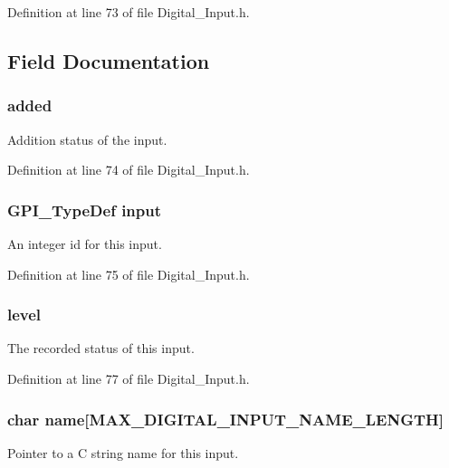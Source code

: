 Definition at line 73 of file Digital\-\_\-\-Input.\-h.



\subsection{Field Documentation}
\hypertarget{struct_digital___input__t_a6f1a4402ff8651dfc5e453b5e3154c2d}{
\subsubsection[{added}]{ added}}\label{struct_digital___input__t_a6f1a4402ff8651dfc5e453b5e3154c2d}
Addition status of the input. 

Definition at line 74 of file Digital\-\_\-\-Input.\-h.

\hypertarget{struct_digital___input__t_abc35a555f8e6b8717b5232ee5220726f}{
\subsubsection[{input}]{\setlength{\rightskip}{0pt plus 5cm}G\-P\-I\-\_\-\-Type\-Def input}}\label{struct_digital___input__t_abc35a555f8e6b8717b5232ee5220726f}
An integer id for this input. 

Definition at line 75 of file Digital\-\_\-\-Input.\-h.

\hypertarget{struct_digital___input__t_a077d2fbd9f466d58856071f5314b9c09}{
\subsubsection[{level}]{ level}}\label{struct_digital___input__t_a077d2fbd9f466d58856071f5314b9c09}
The recorded status of this input. 

Definition at line 77 of file Digital\-\_\-\-Input.\-h.

\hypertarget{struct_digital___input__t_af41190915b6eafe6003d377631e93f5a}{
\subsubsection[{name}]{\setlength{\rightskip}{0pt plus 5cm}char name\mbox{[}{\bf M\-A\-X\-\_\-\-D\-I\-G\-I\-T\-A\-L\-\_\-\-I\-N\-P\-U\-T\-\_\-\-N\-A\-M\-E\-\_\-\-L\-E\-N\-G\-T\-H}\mbox{]}}}\label{struct_digital___input__t_af41190915b6eafe6003d377631e93f5a}
Pointer to a C string name for this input. 

